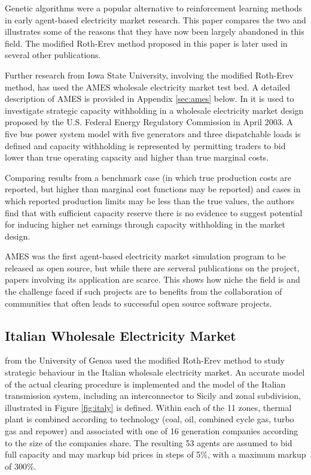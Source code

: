 Genetic algorithms were a popular alternative to reinforcement learning methods
in early agent-based electricity market research.  This paper compares the two
and illustrates some of the reasons that they have now been largely abandoned
in this field. The modified Roth-Erev method proposed in this paper is later
used in several other publications.

Further research from Iowa State University, involving the modified Roth-Erev
method, has used the AMES wholesale electricity market test bed.  A
detailed description of AMES is provided in Appendix \ref{sec:ames} below.  In
 it is used to investigate strategic capacity
withholding in a wholesale electricity market design proposed by the U.S.
Federal Energy Regulatory Commission in April 2003.  A five bus power system model
with five generators and three dispatchable loads is defined and capacity
withholding is represented by permitting traders to bid lower than true
operating capacity and higher than true marginal costs.

Comparing results from a benchmark case (in which true production costs are
reported, but higher than marginal cost functions may be reported) and cases in
which reported production limits may be less than the true values, the authors
find that with sufficient capacity reserve there is no evidence to suggest
potential for inducing higher net earnings through capacity withholding in the
market design.

AMES was the first agent-based electricity market simulation program to be
released as open source, but while there are serveral publications on the
project, papers involving its application are scarce.  This shows how
niche the field is and the challenge faced if such projects are to benefits
from the collaboration of communities that often leads to successful open
source software projects.

\subsection{Italian Wholesale Electricity Market}



 from the University of Genoa used the modified
Roth-Erev method to study strategic behaviour in the Italian wholesale electricity market.  An accurate model of the actual clearing procedure is
implemented and the model of the Italian transmission system, including an
interconnector to Sicily and zonal subdivision, illustrated in Figure
\ref{fig:italy} is defined.  Within each of the 11 zones, thermal plant is
combined according to technology (coal, oil, combined cycle gas, turbo gas and
repower) and associated with one of 16 generation companies according to the
size of the companies share.  The resulting 53 agents are assumed to bid full
capacity and may markup bid prices in steps of 5\%, with a maximum markup of
300\%.

